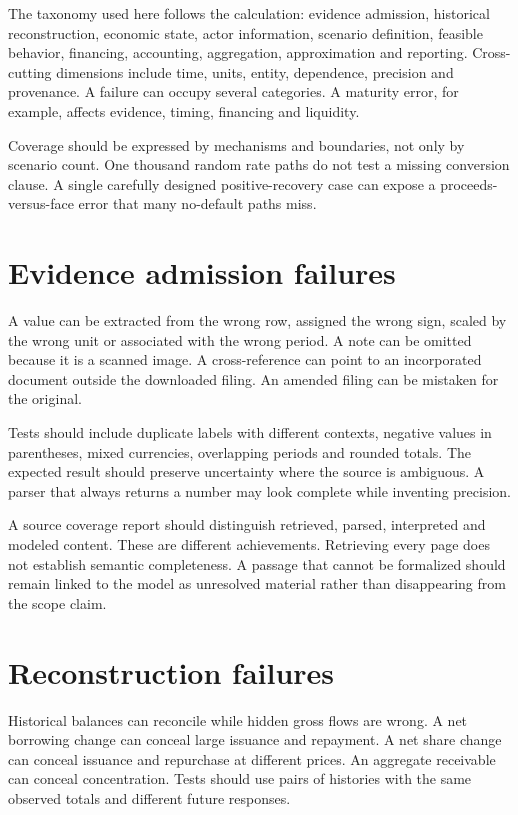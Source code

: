 The taxonomy used here follows the calculation: evidence admission, historical reconstruction, economic state, actor information, scenario definition, feasible behavior, financing, accounting, aggregation, approximation and reporting. Cross-cutting dimensions include time, units, entity, dependence, precision and provenance. A failure can occupy several categories. A maturity error, for example, affects evidence, timing, financing and liquidity.

Coverage should be expressed by mechanisms and boundaries, not only by scenario count. One thousand random rate paths do not test a missing conversion clause. A single carefully designed positive-recovery case can expose a proceeds-versus-face error that many no-default paths miss.

\section{Evidence admission failures}
A value can be extracted from the wrong row, assigned the wrong sign, scaled by the wrong unit or associated with the wrong period. A note can be omitted because it is a scanned image. A cross-reference can point to an incorporated document outside the downloaded filing. An amended filing can be mistaken for the original.

Tests should include duplicate labels with different contexts, negative values in parentheses, mixed currencies, overlapping periods and rounded totals. The expected result should preserve uncertainty where the source is ambiguous. A parser that always returns a number may look complete while inventing precision.

A source coverage report should distinguish retrieved, parsed, interpreted and modeled content. These are different achievements. Retrieving every page does not establish semantic completeness. A passage that cannot be formalized should remain linked to the model as unresolved material rather than disappearing from the scope claim.

\section{Reconstruction failures}
Historical balances can reconcile while hidden gross flows are wrong. A net borrowing change can conceal large issuance and repayment. A net share change can conceal issuance and repurchase at different prices. An aggregate receivable can conceal concentration. Tests should use pairs of histories with the same observed totals and different future responses.


